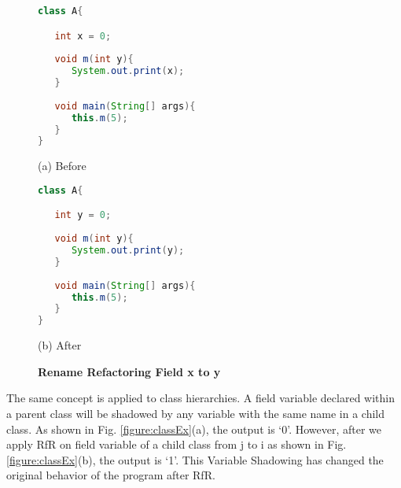 \begin{figure}[th]
\centering
\begin{minipage}[t]{0.47\linewidth}
\begin{lstlisting}[language=java, basicstyle=\scriptsize\ttfamily,frame=single]
class A{

   int x = 0;
	
   void m(int y){
      System.out.print(x);
   }
	
   void main(String[] args){
      this.m(5);
   }
}

\end{lstlisting}
\centering(a) Before
\end{minipage}
\hfill
\begin{minipage}[t]{0.47\linewidth}
\begin{lstlisting}[language=java, basicstyle=\scriptsize\ttfamily,frame=single]
class A{

   int y = 0;
	
   void m(int y){
      System.out.print(y);
   }
	
   void main(String[] args){
      this.m(5);
   }
}\end{lstlisting}
\centering(b) After
\end{minipage}
\caption{\textbf{Rename Refactoring Field x to y}}
\label{figure:sameBlock}
\end{figure}

The same concept is applied to class hierarchies. A field variable declared within a parent class will be shadowed by any variable with the same name in a child class. As shown in Fig. \ref{figure:classEx}(a), the output is `0'. However, after we apply RfR on field variable of a child class from j to i as shown in Fig. \ref{figure:classEx}(b), the output is `1'. This Variable Shadowing has changed the original behavior of the program after RfR. 

